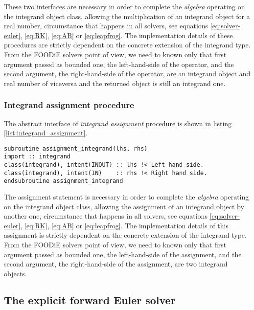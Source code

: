\documentclass[pdftex,preprint,3p,times,numbers]{elsarticle}
\begin{document}
These two interfaces are necessary in order to complete the \emph{algebra} operating on the integrand object class, allowing the multiplication of an integrand object for a real number, circumstance that happens in all solvers, see equations \ref{eq:solver-euler}, \ref{eq:RK}, \ref{eq:AB} or \ref{eq:leapfrog}. The implementation details of these procedures are strictly dependent on the concrete extension of the integrand type. From the FOODiE solvers point of view, we need to known only that first argument passed as bounded one, the left-hand-side of the operator, and the second argument, the right-hand-side of the operator, are an integrand object and real number of viceversa and the returned object is still an integrand one.

\subsubsection{Integrand assignment procedure}

The abstract interface of \emph{integrand assignment} procedure is shown in listing \ref{list:integrand_assignment}.

\begin{lstlisting}[firstnumber=1,style=code,caption={integrand assignment procedure interface},label={list:integrand_assignment}]
subroutine assignment_integrand(lhs, rhs)
import :: integrand
class(integrand), intent(INOUT) :: lhs !< Left hand side.
class(integrand), intent(IN)    :: rhs !< Right hand side.
endsubroutine assignment_integrand
\end{lstlisting}

The assignment statement is necessary in order to complete the \emph{algebra} operating on the integrand object class, allowing the assignment of an integrand object by another one, circumstance that happens in all solvers, see equations \ref{eq:solver-euler}, \ref{eq:RK}, \ref{eq:AB} or \ref{eq:leapfrog}. The implementation details of this assignment is strictly dependent on the concrete extension of the integrand type. From the FOODiE solvers point of view, we need to known only that first argument passed as bounded one, the left-hand-side of the assignment, and the second argument, the right-hand-side of the assignment, are two integrand objects.

\clearpage

\subsection{The explicit forward Euler solver}\label{subsec:solver_euler}
\end{document}
